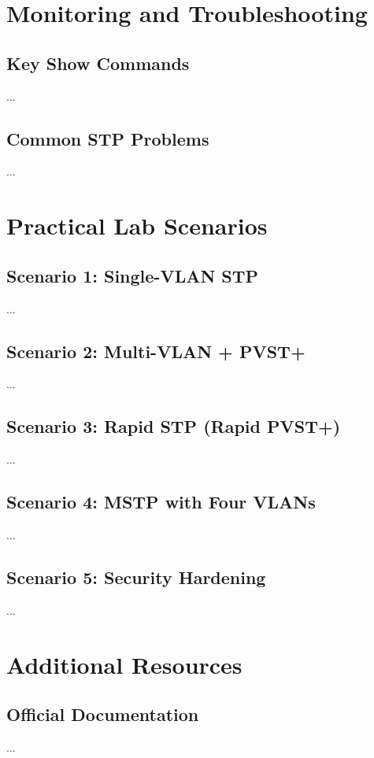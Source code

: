 \documentclass[12pt]{report}
\begin{document}
\chapter{Monitoring and Troubleshooting}
\section{Key Show Commands}
...

\section{Common STP Problems}
...

\chapter{Practical Lab Scenarios}
\section{Scenario 1: Single-VLAN STP}
...

\section{Scenario 2: Multi-VLAN + PVST+}
...

\section{Scenario 3: Rapid STP (Rapid PVST+)}
...

\section{Scenario 4: MSTP with Four VLANs}
...

\section{Scenario 5: Security Hardening}
...

\chapter{Additional Resources}
\section{Official Documentation}
...
\end{document}
